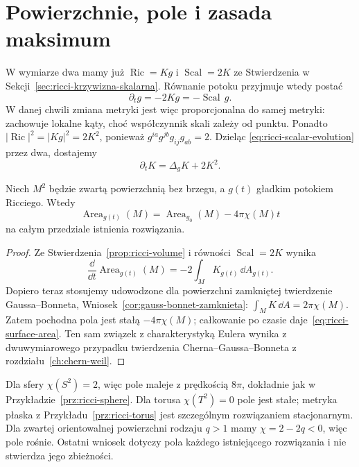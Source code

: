 \section{Powierzchnie, pole i zasada maksimum}
\label{sec:ricci-surfaces}

W wymiarze dwa mamy już
$\operatorname{Ric}=Kg$ i $\operatorname{Scal}=2K$
ze Stwierdzenia w Sekcji~\ref{sec:ricci-krzywizna-skalarna}.
Równanie potoku przyjmuje wtedy postać
\begin{equation}\label{eq:ricci-surface-metric}
 \partial_tg=-2Kg=-\operatorname{Scal}\,g.
\end{equation}
W danej chwili zmiana metryki jest więc proporcjonalna
do samej metryki: zachowuje lokalne kąty, choć współczynnik
skali zależy od punktu. Ponadto
$|\operatorname{Ric}|^2=|Kg|^2=2K^2$, ponieważ
$g^{ia}g^{jb}g_{ij}g_{ab}=2$. Dzieląc
\eqref{eq:ricci-scalar-evolution} przez dwa, dostajemy
\begin{equation}\label{eq:ricci-surface-curvature}
 \partial_tK=\Delta_gK+2K^2.
\end{equation}

\begin{stwierdzenie}
\label{prop:ricci-surface-area}
Niech $M^2$ będzie zwartą powierzchnią bez brzegu,
a $g(t)$ gładkim potokiem Ricciego. Wtedy
\begin{equation}\label{eq:ricci-surface-area}
 \operatorname{Area}_{g(t)}(M)
 =\operatorname{Area}_{g_0}(M)-4\pi\chi(M)t
\end{equation}
na całym przedziale istnienia rozwiązania.
\end{stwierdzenie}
\begin{proof}
Ze Stwierdzenia~\ref{prop:ricci-volume} i równości
$\operatorname{Scal}=2K$ wynika
\[
 \frac{\dd}{\dd t}\operatorname{Area}_{g(t)}(M)
 =-2\int_M K_{g(t)}\,\dd A_{g(t)}.
\]
Dopiero teraz stosujemy udowodzone dla powierzchni
zamkniętej twierdzenie Gaussa--Bonneta,
Wniosek~\ref{cor:gauss-bonnet-zamknieta}:
$\int_MK\,\dd A=2\pi\chi(M)$.
Zatem pochodna pola jest stałą $-4\pi\chi(M)$;
całkowanie po czasie daje~\eqref{eq:ricci-surface-area}.
Ten sam związek z charakterystyką Eulera wynika z
dwuwymiarowego przypadku twierdzenia Cherna--Gaussa--Bonneta
z rozdziału~\ref{ch:chern-weil}.
\end{proof}

Dla sfery $\chi(S^2)=2$, więc pole maleje z prędkością
$8\pi$, dokładnie jak w Przykładzie~\ref{prz:ricci-sphere}.
Dla torusa $\chi(T^2)=0$ pole jest stałe; metryka
płaska z Przykładu~\ref{prz:ricci-torus} jest szczególnym
rozwiązaniem stacjonarnym. Dla zwartej orientowalnej
powierzchni rodzaju $q>1$ mamy $\chi=2-2q<0$,
więc pole rośnie. Ostatni wniosek dotyczy pola każdego
istniejącego rozwiązania i nie stwierdza jego zbieżności.

